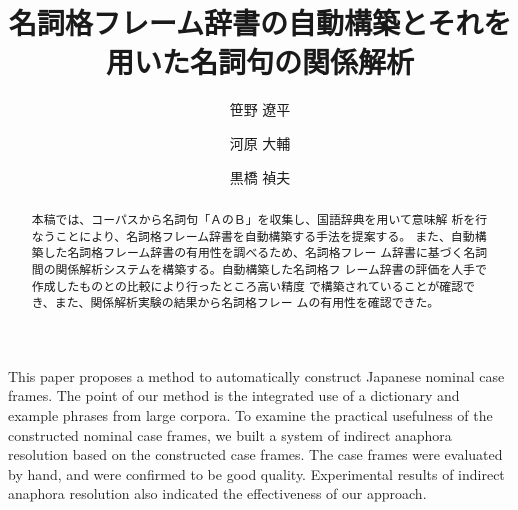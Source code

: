 \documentclass{nlp}
\begin{document}
\setcounter{example}{1}

\setcounter{page}{3}
\setcounter{Volume}{2}
\setcounter{Number}{3}
\setcounter{Month}{7}

\title{名詞格フレーム辞書の自動構築とそれを用いた名詞句の関係解析}
\author{笹野 遼平 \and 河原 大輔 \and 
黒橋 禎夫}



\begin{abstract}
 本稿では、コーパスから名詞句「ＡのＢ」を収集し、国語辞典を用いて意味解
 析を行なうことにより、名詞格フレーム辞書を自動構築する手法を提案する。
 また、自動構築した名詞格フレーム辞書の有用性を調べるため、名詞格フレー
 ム辞書に基づく名詞間の関係解析システムを構築する。自動構築した名詞格フ
 レーム辞書の評価を人手で作成したものとの比較により行ったところ高い精度
 で構築されていることが確認でき、また、関係解析実験の結果から名詞格フレー
 ムの有用性を確認できた。
\end{abstract}



\begin{eabstract}
This paper proposes a method to automatically construct Japanese
nominal case frames. The point of our method is the integrated use of a
dictionary and example phrases from large corpora. To examine the
practical usefulness of the constructed nominal case frames, we built a
 system of indirect anaphora resolution based on the constructed case 
frames. The case frames were evaluated by hand, and were confirmed to be
 good quality. Experimental results of indirect anaphora 
resolution also indicated the effectiveness of our approach.
\end{eabstract}


\maketitle
\end{document}
